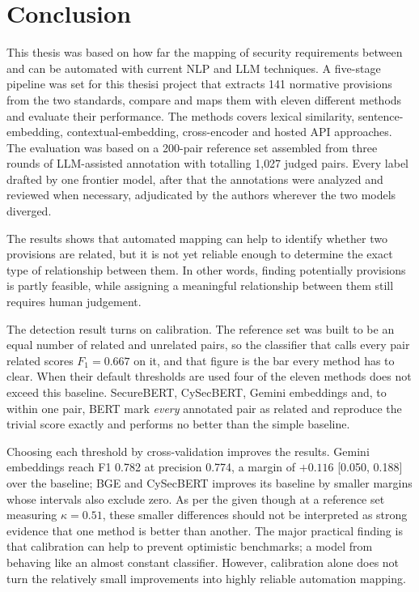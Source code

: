 \chapter{Conclusion}\label{ch:conclusion}

This thesis was based on how far the mapping of security requirements between
\standardA{} and \standardB{} can be automated with current NLP and LLM
techniques. A five-stage pipeline was set for this thesisi project that extracts 141 normative
provisions from the two standards, compare and maps them with eleven different methods and 
evaluate their performance. The methods covers lexical similarity, sentence-embedding, contextual-embedding, cross-encoder and hosted API approaches. The evaluation was based on  a 200-pair reference set assembled
from three rounds of LLM-assisted annotation with totalling 1{,}027 judged pairs. 
Every label drafted by one frontier model, after that the annotations were analyzed and reviewed 
when necessary, adjudicated by the authors wherever the two models diverged.


The results shows that automated mapping can help to identify whether two provisions are related,
but it is not yet reliable enough to determine the exact type of relationship between them. 
In other words, finding potentially provisions is partly feasible, while assigning a meaningful relationship between them still requires human judgement.


The detection result turns on calibration. The reference set was built to be an equal number of related and unrelated pairs, so the classifier that calls every pair related scores $F_1 = 0.667$ on it, and 
that figure is the bar every method has to clear. When their default thresholds are used 
four of the eleven methods does not exceed this baseline. SecureBERT, CySecBERT, Gemini embeddings and, to within one pair, BERT mark \emph{every} annotated pair as related and reproduce the trivial score exactly and performs no better 
than the simple baseline.

Choosing each threshold by cross-validation improves the results.
Gemini embeddings reach F1 0.782 at precision 0.774, a margin of $+0.116$ [0.050, 0.188] over the baseline; BGE and CySecBERT improves its baseline by smaller margins whose intervals also exclude zero. As per the given though at a
reference set measuring $\kappa = 0.51$, these smaller differences should not be interpreted as strong evidence that one method is better than another. The major practical finding is that calibration can help to prevent optimistic benchmarks; a model from behaving like an almost constant classifier. However, calibration alone does not turn the relatively small improvements into highly reliable automation mapping.

